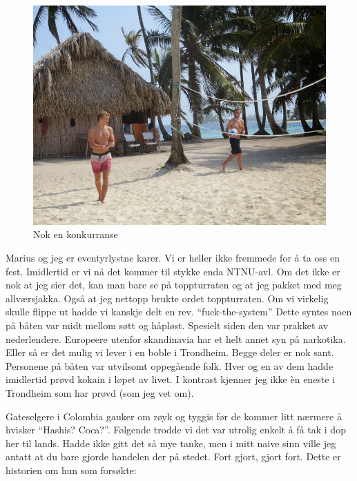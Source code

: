 \begin{figure}[H]
	\centering
	\includegraphics[width=\textwidth]{volllyduel}
	\caption*{Nok en konkurranse}
	\label{fig:volley}
\end{figure}
Marius og jeg er eventyrlystne karer. Vi er heller ikke fremmede for å
ta oss en fest. Imidlertid er vi nå det kommer til stykke enda
NTNU-avl. Om det ikke er nok at jeg sier det, kan man bare se på
toppturraten og at jeg pakket med meg allværsjakka. Også at jeg
nettopp brukte ordet toppturraten.
Om vi virkelig skulle flippe ut hadde vi kanskje delt en rev.
``fuck-the-system''
Dette syntes noen  på båten var midt mellom søtt og håpløst. Spesielt siden den var prakket av
nederlendere. Europeere utenfor skandinavia har et helt annet syn på narkotika. Eller så
er det mulig vi lever i en boble i Trondheim. Begge deler er nok sant.
Personene på båten var utvilsomt oppegående folk. Hver og en av dem
hadde imidlertid prøvd kokain i løpet av livet. I kontrast kjenner jeg
ikke èn eneste i Trondheim som har prøvd (som jeg vet om).

Gateselgere i Colombia gauker om røyk og tyggis før de kommer litt
nærmere å hvisker ``Hashis? Coca?''.  Følgende trodde vi det var
utrolig enkelt å få tak i dop her til lands. Hadde ikke gitt det så
mye tanke, men i mitt naive sinn ville jeg antatt at du bare gjorde
handelen der på stedet. Fort gjort, gjort fort. Dette er historien om
hun som forsøkte:

